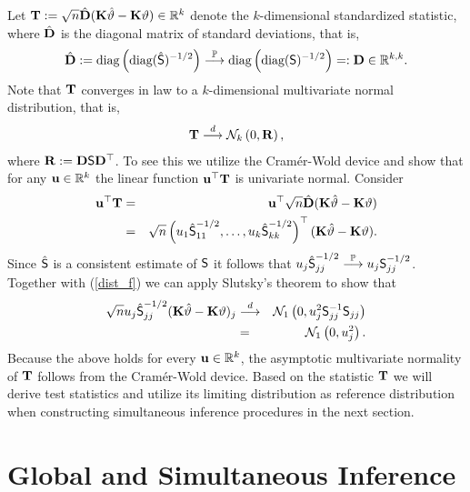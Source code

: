 \documentclass[12pt]{article}
\begin{document}
Let $\T := \sqrt{n} \hat{\D} (\K \hat{\vartheta} - \K \vartheta) \in \R^k$
denote the $k$-dimensional standardized statistic, where $\hat{\D}$ is the
diagonal matrix of standard deviations, that is, 
\begin{eqnarray*}
\hat{\D} := \text{diag}\left(\text{diag}(\hat{\S })^{-1/2}\right) \cP \text{%
diag}\left(\text{diag}(\S )^{-1/2}\right) =: \D \in \R^{k,k}.
\end{eqnarray*}
Note that $\T$ converges in law to a $k$-dimensional multivariate normal
distribution, that is, 
\begin{eqnarray*}
\T \cL \N_k\left(0, \Cor\right),
\end{eqnarray*}
where $\Cor := \D \S \D^\top$. To see this we utilize the Cram{\'e}r-Wold
device \citep[e.g., Theorem 5.1.8
in][]{Lehmann1999} and show that for any $\uu \in \R^k$ the linear function $%
\uu^\top \T$ is univariate normal. Consider 
\begin{eqnarray*}
\uu^\top \T & = & \uu^\top \sqrt{n} \hat{\D} (\K \hat{\vartheta} - \K %
\vartheta) \\
& = & \sqrt{n} \left(u_1 \hat{\S }_{11}^{-1/2}, \dots, u_k \hat{\S }%
_{kk}^{-1/2}\right)^\top(\K \hat{\vartheta} - \K \vartheta).
\end{eqnarray*}
Since $\hat{\S }$ is a consistent estimate of $\S $ it follows that $u_j 
\hat{\S }_{jj}^{-1/2} \cP u_j \S _{jj}^{-1/2}$. Together with (\ref{dist_f})
we can apply Slutsky's theorem \citep[Theorem 2.3.3
in][]{Lehmann1999} to show that 
\begin{eqnarray*}
\sqrt{n} u_j \hat{\S }_{jj}^{-1/2} (\K \hat{\vartheta} - \K \vartheta)_j & %
\cL & \N_1\left(0, u_j^2 \S _{jj}^{-1} \S _{jj}\right) \\
& = & \N_1\left(0, u_j^2\right).
\end{eqnarray*}
Because the above holds for every $\uu \in \R^k$, the asymptotic
multivariate normality of $\T$ follows from the Cram{\'e}r-Wold device.
Based on the statistic $\T$ we will derive test statistics and utilize its
limiting distribution as reference distribution when constructing
simultaneous inference procedures in the next section.

\section{Global and Simultaneous Inference}

\label{siminf}
\end{document}
